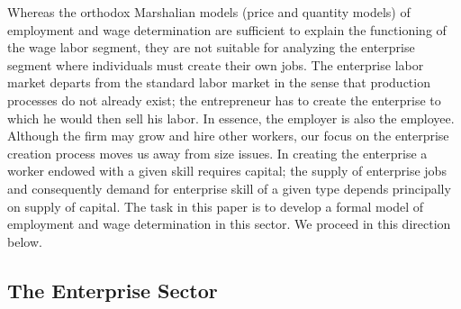 \documentclass[
  a4paper,
  DIV=11,
  numbers=noendperiod]{scrartcl}
\begin{document}
Whereas the orthodox Marshalian models (price and quantity models) of
employment and wage determination are sufficient to explain the
functioning of the wage labor segment, they are not suitable for
analyzing the enterprise segment where individuals must create their own
jobs. The enterprise labor market departs from the standard labor market
in the sense that production processes do not already exist; the
entrepreneur has to create the enterprise to which he would then sell
his labor. In essence, the employer is also the employee. Although the
firm may grow and hire other workers, our focus on the enterprise
creation process moves us away from size issues. In creating the
enterprise a worker endowed with a given skill requires capital; the
supply of enterprise jobs and consequently demand for enterprise skill
of a given type depends principally on supply of capital. The task in
this paper is to develop a formal model of employment and wage
determination in this sector. We proceed in this direction below.

\hypertarget{the-enterprise-sector}{%
\subsection{The Enterprise Sector}\label{the-enterprise-sector}}
\end{document}
